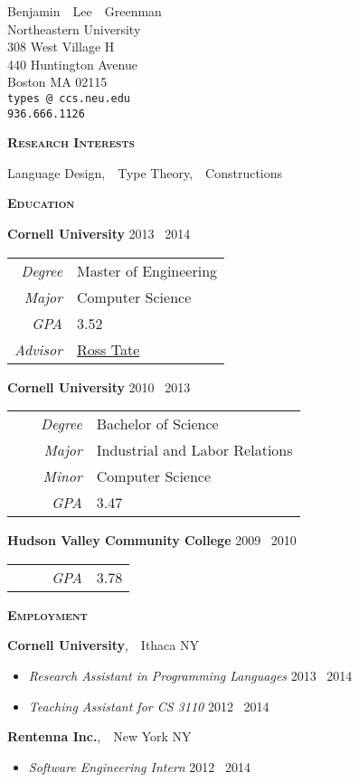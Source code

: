 \documentclass{article}
\makeatletter
\renewcommand{\maketitle}{
\begin{center}
  {\large{Benjamin~~Lee~~Greenman}}
\vspace{0.1cm}
\\Northeastern University
\\308 West Village H
\\440 Huntington Avenue
\\Boston MA 02115
\\\texttt{\fontseries{m}types\,@\,ccs.neu.edu}
\\\texttt{\fontseries{m}936.666.1126}
\end{center}
}
\newcommand{\mysection}[1]{\vspace{0.5cm}
\hspace{-1.3cm}\textsc{\textbf{#1}}~\hrulefill}
\newcommand{\mysubsection}[1]{\hspace{-0.7cm}\textbf{#1}}
\makeatother
\begin{document}
\maketitle


\mysection{Research Interests}

Language Design,~~Type Theory,~~Constructions

\mysection{Education}

\mysubsection{Cornell University} \hfill 2013 \textendash\ 2014 \\
\begin{tabular}{>{\it}r l}
Degree & Master of Engineering\\
Major & Computer Science\\
GPA & 3.52\\
Advisor & \href{http://www.cs.cornell.edu/~ross/}{Ross Tate}
\end{tabular}

\mysubsection{Cornell University} \hfill 2010 \textendash\ 2013\\
\begin{tabular}{>{\it}r l}
Degree & Bachelor of Science\\
Major & Industrial and Labor Relations\\
Minor & Computer Science\\
~~~~~GPA & 3.47\\
\end{tabular}

\mysubsection{Hudson Valley Community College} \hfill 2009 \textendash\ 2010 \\ 
\begin{tabular}{>{\it}r l}
~~~~~GPA & 3.78\\
\end{tabular}

\mysection{Employment}

\mysubsection{Cornell University},~~Ithaca NY
\begin{itemize}
\item \emph{Research Assistant in Programming Languages} \hfill 2013 \textendash\ 2014
\item \emph{Teaching Assistant for CS 3110} \hfill 2012 \textendash\ 2014
\end{itemize}

\mysubsection{Rentenna Inc.},~~New York NY
\begin{itemize}
\item \emph{Software Engineering Intern} \hfill 2012 \textendash\ 2014
\end{itemize}
\end{document}

